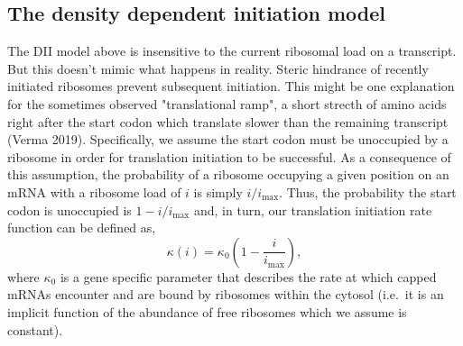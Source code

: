 \documentclass[review]{elsarticle}
\newcommand\mymarginpar[1]{\marginpar{\begin{spacing}{0.7}\singlespacing \tiny #1 \end{spacing}}}  %
\newcommand{\imax}{\ensuremath{i_{\max}}\xspace}
\begin{document}
\subsection{The density dependent initiation model}\label{sec:assumed_forms}
The DII model above is insensitive to the current ribosomal load on a transcript. 
But this doesn't mimic what happens in reality. Steric hindrance of recently initiated ribosomes prevent subsequent initiation.
This might be one explanation for the sometimes observed "translational ramp", a short strecth of amino acids right after the start codon which translate slower than the remaining transcript (Verma 2019). 
Specifically, we assume the start codon must be unoccupied by a ribosome in order for translation initiation to be successful.
As a consequence of this assumption, the probability of a ribosome occupying a given position on an mRNA with a ribosome load of $i$ is simply $i/\imax$.
Thus, the probability the start codon is unoccupied is $1-i/\imax$ and, in turn, our translation initiation rate function can be defined as, 
\begin{equation}\label{eq:kappa}
\kappa(i)=\kappa_0\left(1-\frac{i}{\imax}\right),
\end{equation} 
where $\kappa_0$ is a gene specific parameter that describes the rate at which capped mRNAs encounter and are bound by ribosomes within the cytosol (i.e.~it is an implicit function of the abundance of free ribosomes which we assume is constant).


\end{document}
